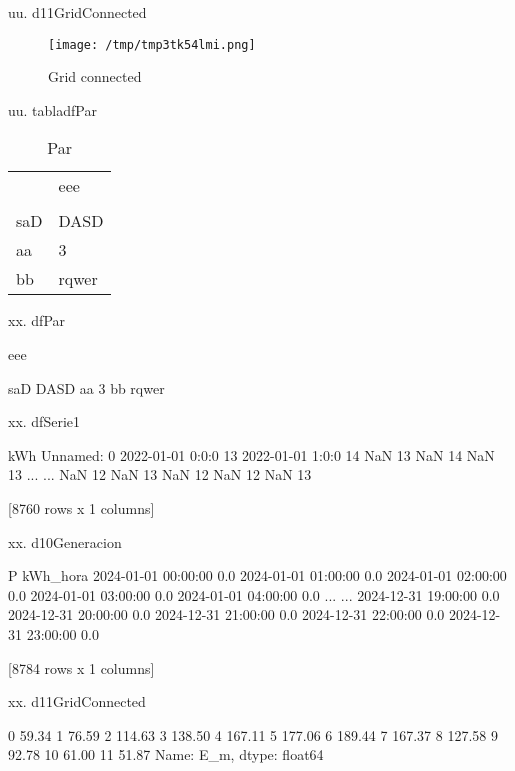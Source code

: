 \documentclass[a4paper,10pt,twocolumn]{article}
\begin{document}
\begin{Form}
\begin{figure}[H]
                    \label{fig:dfassssdfsa}
                    \end{figure}
                    

uu. d11GridConnected

\begin{figure}[H] \centering
                    
                    \texttt{[image: /tmp/tmp3tk54lmi.png]}
                    \caption{Grid connected}
                    
                    \label{fig:dfassssdfsa}
                    \end{figure}
                    

uu. tabladfPar


                    \begin{table}[H] \centering
                        {
                        \begin{tabular}{ll}
\toprule
 & eee \\
 &  \\
\midrule
saD & DASD \\
aa & 3 \\
bb & rqwer \\
\bottomrule
\end{tabular}

                        }
                        \caption{Par}
                    \end{table}
                    

xx. dfPar

       eee
          
saD   DASD
aa       3
bb   rqwer

xx. dfSerie1

                  kWh
Unnamed: 0           
2022-01-01 0:0:0   13
2022-01-01 1:0:0   14
NaN                13
NaN                14
NaN                13
...               ...
NaN                12
NaN                13
NaN                12
NaN                12
NaN                13

[8760 rows x 1 columns]

xx. d10Generacion

                       P
kWh_hora                
2024-01-01 00:00:00  0.0
2024-01-01 01:00:00  0.0
2024-01-01 02:00:00  0.0
2024-01-01 03:00:00  0.0
2024-01-01 04:00:00  0.0
...                  ...
2024-12-31 19:00:00  0.0
2024-12-31 20:00:00  0.0
2024-12-31 21:00:00  0.0
2024-12-31 22:00:00  0.0
2024-12-31 23:00:00  0.0

[8784 rows x 1 columns]

xx. d11GridConnected

0      59.34
1      76.59
2     114.63
3     138.50
4     167.11
5     177.06
6     189.44
7     167.37
8     127.58
9      92.78
10     61.00
11     51.87
Name: E_m, dtype: float64
\fi
\end{Form}
\end{document}
